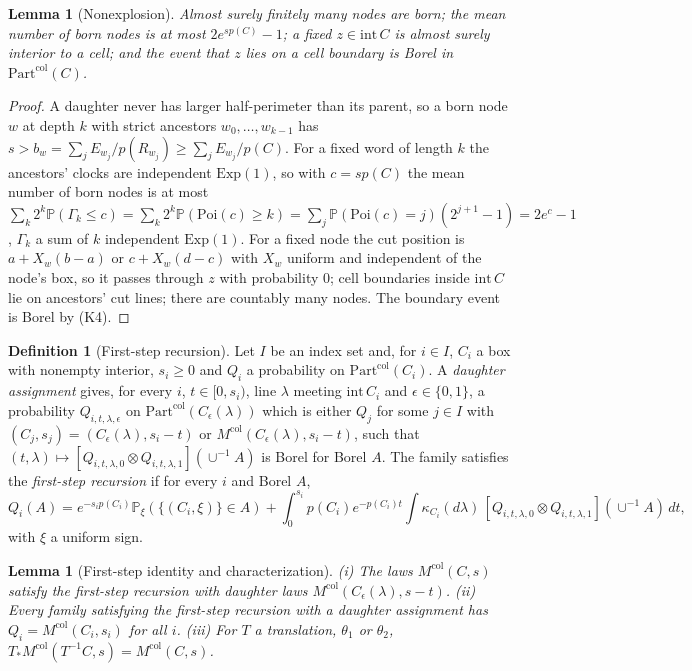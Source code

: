 \documentclass[11pt]{article}
\theoremstyle{plain}
\newtheorem{lemma}[theorem]{Lemma}
\theoremstyle{definition}
\newtheorem{definition}[theorem]{Definition}
\theoremstyle{remark}
\newcommand{\PP}{\mathbb{P}}
\newcommand{\Part}{\mathrm{Part}}
\newcommand{\Mcol}{M^{\mathrm{col}}}
\begin{document}
\begin{lemma}[Nonexplosion]\label{lem:E-nonexplosion}
Almost surely finitely many nodes are born; the mean number of born nodes is at
most $2e^{sp(C)}-1$; a fixed $z\in\mathrm{int}\,C$ is almost surely interior to a cell; and the
event that $z$ lies on a cell boundary is Borel in $\Part^{\mathrm{col}}(C)$.
\end{lemma}

\begin{proof}
A daughter never has larger half-perimeter than its parent, so a born node $w$ at
depth $k$ with strict ancestors $w_0,\dots,w_{k-1}$ has
$s>b_w=\sum_jE_{w_j}/p(R_{w_j})\ge\sum_jE_{w_j}/p(C)$. For a fixed word of length $k$ the
ancestors' clocks are independent $\mathrm{Exp}(1)$, so with $c=sp(C)$ the mean number of born
nodes is at most $\sum_k2^{k}\PP(\Gamma_k\le c)=\sum_k2^{k}\PP(\mathrm{Poi}(c)\ge k)=\sum_j\PP(\mathrm{Poi}(c)=j)(2^{j+1}-1)=2e^{c}-1$,
$\Gamma_k$ a sum of $k$ independent $\mathrm{Exp}(1)$. For a fixed node the cut position is
$a+X_w(b-a)$ or $c+X_w(d-c)$ with $X_w$ uniform and independent of the node's box, so
it passes through $z$ with probability $0$; cell boundaries inside $\mathrm{int}\,C$ lie on
ancestors' cut lines; there are countably many nodes. The boundary event is
Borel by (K4).
\end{proof}

\begin{definition}[First-step recursion]\label{def:E-rec}
Let $I$ be an index set and, for $i\in I$, $C_i$ a box with nonempty interior,
$s_i\ge0$ and $Q_i$ a probability on $\Part^{\mathrm{col}}(C_i)$. A \emph{daughter assignment}
gives, for every $i$, $t\in[0,s_i)$, line $\lambda$ meeting $\mathrm{int}\,C_i$ and $\epsilon\in\{0,1\}$, a
probability $Q_{i,t,\lambda,\epsilon}$ on $\Part^{\mathrm{col}}(C_\epsilon(\lambda))$ which is either $Q_j$ for some
$j\in I$ with $(C_j,s_j)=(C_\epsilon(\lambda),s_i-t)$ or $\Mcol(C_\epsilon(\lambda),s_i-t)$, such that
$(t,\lambda)\mapsto[Q_{i,t,\lambda,0}\otimes Q_{i,t,\lambda,1}](\cup^{-1}A)$ is Borel for Borel $A$. The family
satisfies the \emph{first-step recursion} if for every $i$ and Borel $A$,
\[
Q_i(A)=e^{-s_ip(C_i)}\PP_\xi(\{(C_i,\xi)\}\in A)
+\int_0^{s_i}p(C_i)e^{-p(C_i)t}\!\int\kappa_{C_i}(d\lambda)\,[Q_{i,t,\lambda,0}\otimes Q_{i,t,\lambda,1}](\cup^{-1}A)\,dt,
\]
with $\xi$ a uniform sign.
\end{definition}

\begin{lemma}[First-step identity and characterization]\label{lem:E-recursion}
(i) The laws $\Mcol(C,s)$ satisfy the first-step recursion with daughter laws
$\Mcol(C_\epsilon(\lambda),s-t)$. (ii) Every family satisfying the first-step recursion
with a daughter assignment has $Q_i=\Mcol(C_i,s_i)$ for all $i$. (iii) For $T$ a
translation, $\theta_1$ or $\theta_2$, $T_*\Mcol(T^{-1}C,s)=\Mcol(C,s)$.
\end{lemma}
\end{document}
